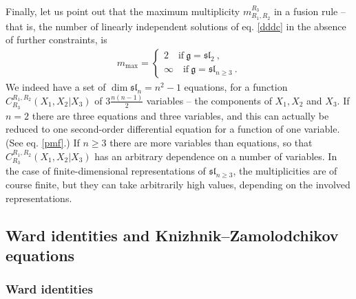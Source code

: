 \documentclass[12pt, a4paper, notitlepage, twoside]{report}
\numberwithin{equation}{section}
\theoremstyle{break}
\begin{document}
Finally, let us point out that the maximum multiplicity $m_{R_1,R_2}^{R_3}$ in a fusion rule -- that is, the number of linearly independent solutions of eq. \eqref{dddc} in the absence of further constraints, is 
\begin{align}
 m_{\mathrm{max}} = \left\{\begin{array}{l}  2 \quad \text{if}\ \mathfrak{g}=\mathfrak{sl}_2\ , \\ \infty \quad \text{if}\ \mathfrak{g}=\mathfrak{sl}_{n\geq 3}\ . \end{array}\right. 
\end{align}
We indeed have a set of $\dim \mathfrak{sl}_n=n^2-1$ equations, for a function $C^{R_1,R_2}_{R_3}(X_1,X_2|X_3)$ of $3\frac{n(n-1)}{2}$ variables -- the components of $X_1,X_2$ and $X_3$.
If $n=2$ there are three equations and three variables, and this can actually be reduced to one second-order differential equation for a function of one variable. (See eq. \eqref{pmf}.)
If $n\geq 3$ there are more variables than equations, so that $C^{R_1,R_2}_{R_3}(X_1,X_2|X_3)$ has an arbitrary dependence on a number of variables.
In the case of finite-dimensional representations of $\mathfrak{sl}_{n\geq 3}$, the multiplicities are of course finite, but they can take arbitrarily high values, depending on the involved representations.

\subsection{Ward identities and Knizhnik--Zamolodchikov equations \label{secwikz}}

\subsubsection{Ward identities}
\end{document}
